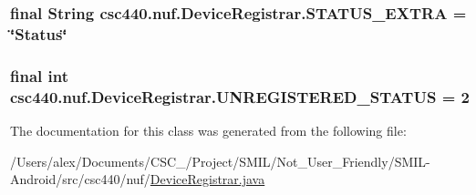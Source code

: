 \hypertarget{classcsc440_1_1nuf_1_1_device_registrar_aaf88ac176dfd4264b4138fc00b49998a}{
\subsubsection[{S\-T\-A\-T\-U\-S\-\_\-\-E\-X\-T\-R\-A}]{\setlength{\rightskip}{0pt plus 5cm}final String {\bf csc440.\-nuf.\-Device\-Registrar.\-S\-T\-A\-T\-U\-S\-\_\-\-E\-X\-T\-R\-A} = \char`\"{}Status\char`\"{}}}\label{classcsc440_1_1nuf_1_1_device_registrar_aaf88ac176dfd4264b4138fc00b49998a}
\hypertarget{classcsc440_1_1nuf_1_1_device_registrar_a9a90ee9e8e64edc961b0e3c3b454d047}{
\subsubsection[{U\-N\-R\-E\-G\-I\-S\-T\-E\-R\-E\-D\-\_\-\-S\-T\-A\-T\-U\-S}]{\setlength{\rightskip}{0pt plus 5cm}final int {\bf csc440.\-nuf.\-Device\-Registrar.\-U\-N\-R\-E\-G\-I\-S\-T\-E\-R\-E\-D\-\_\-\-S\-T\-A\-T\-U\-S} = 2}}\label{classcsc440_1_1nuf_1_1_device_registrar_a9a90ee9e8e64edc961b0e3c3b454d047}


The documentation for this class was generated from the following file\-:\begin{DoxyCompactItemize}
\item 
/\-Users/alex/\-Documents/\-C\-S\-C\-\_/\-Project/\-S\-M\-I\-L/\-Not\-\_\-\-User\-\_\-\-Friendly/\-S\-M\-I\-L-\/\-Android/src/csc440/nuf/\hyperlink{_device_registrar_8java}{Device\-Registrar.\-java}\end{DoxyCompactItemize}
